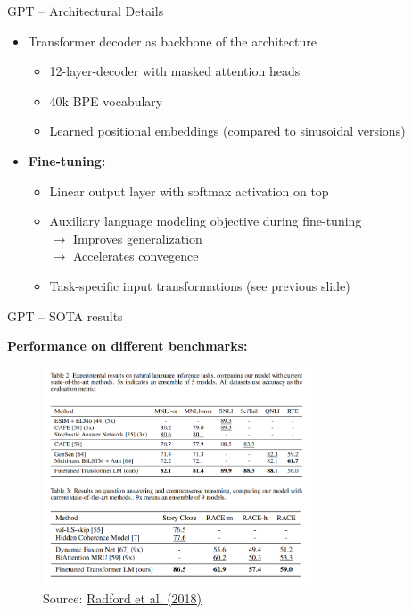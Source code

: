 \documentclass[]{beamer}
\begin{document}
\begin{frame}{GPT -- Architectural Details}
	\begin{itemize}
		\item Transformer decoder as backbone of the architecture
			\begin{itemize}
				\item 12-layer-decoder with masked attention heads
				\item 40k BPE vocabulary
				\item Learned positional embeddings (compared to sinusoidal versions)
			\end{itemize}
		\item \textbf{Fine-tuning:}
			\begin{itemize}
				\item Linear output layer with softmax activation on top
				\item Auxiliary language modeling objective during fine-tuning\\
							$\rightarrow$ Improves generalization\\
							$\rightarrow$ Accelerates convegence
				\item Task-specific input transformations (see previous slide)
			\end{itemize}
	\end{itemize}
\end{frame}



\begin{frame}{GPT -- SOTA results}

	\textbf{Performance on different benchmarks:}

	\begin{figure}
		\centering
		\includegraphics[width = 8cm]{figure/gpt-sota.png}\\ 
		\footnotesize{Source:} \href{https://s3-us-west-2.amazonaws.com/openai-assets/research-covers/language-unsupervised/language_understanding_paper.pdf}{\footnotesize Radford et al. (2018)}
	\end{figure}
\end{frame}
\end{document}
